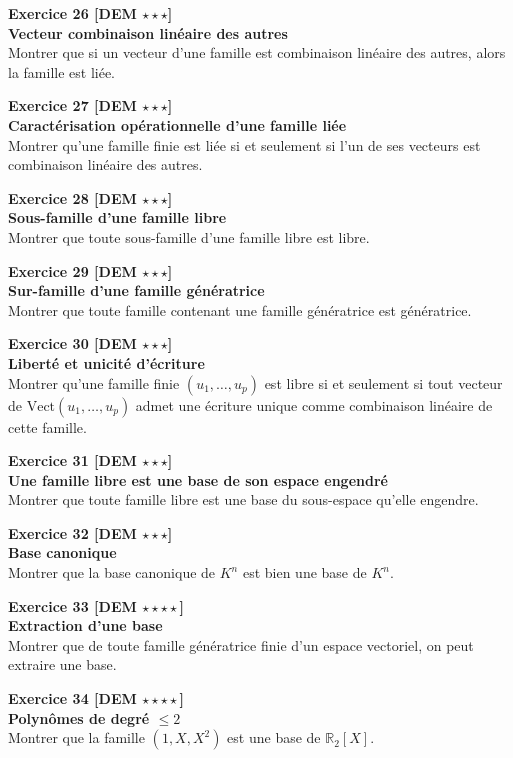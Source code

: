 \documentclass[11pt,a4paper]{article}
\begin{document}
\textbf{Exercice 26 [DEM $\star\star\star$]}\\
\textbf{Vecteur combinaison linéaire des autres}\\
Montrer que si un vecteur d’une famille est combinaison linéaire des autres, alors la famille est liée.

\textbf{Exercice 27 [DEM $\star\star\star$]}\\
\textbf{Caractérisation opérationnelle d’une famille liée}\\
Montrer qu’une famille finie est liée si et seulement si l’un de ses vecteurs est combinaison linéaire des autres.

\textbf{Exercice 28 [DEM $\star\star\star$]}\\
\textbf{Sous-famille d’une famille libre}\\
Montrer que toute sous-famille d’une famille libre est libre.

\textbf{Exercice 29 [DEM $\star\star\star$]}\\
\textbf{Sur-famille d’une famille génératrice}\\
Montrer que toute famille contenant une famille génératrice est génératrice.

\textbf{Exercice 30 [DEM $\star\star\star$]}\\
\textbf{Liberté et unicité d’écriture}\\
Montrer qu’une famille finie \((u_1,\dots,u_p)\) est libre si et seulement si tout vecteur de \(\mathrm{Vect}(u_1,\dots,u_p)\) admet une écriture unique comme combinaison linéaire de cette famille.

\textbf{Exercice 31 [DEM $\star\star\star$]}\\
\textbf{Une famille libre est une base de son espace engendré}\\
Montrer que toute famille libre est une base du sous-espace qu’elle engendre.

\textbf{Exercice 32 [DEM $\star\star\star$]}\\
\textbf{Base canonique}\\
Montrer que la base canonique de \(K^n\) est bien une base de \(K^n\).

\textbf{Exercice 33 [DEM $\star\star\star\star$]}\\
\textbf{Extraction d’une base}\\
Montrer que de toute famille génératrice finie d’un espace vectoriel, on peut extraire une base.

\textbf{Exercice 34 [DEM $\star\star\star\star$]}\\
\textbf{Polynômes de degré \(\le 2\)}\\
Montrer que la famille \((1,X,X^2)\) est une base de \(\mathbb{R}_2[X]\).
\end{document}
